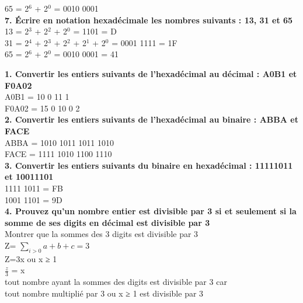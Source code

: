 65 = 2$^{6}$ + 2$^{0}$ = 0010 0001 \\

\textbf{7. Écrire en notation hexadécimale les nombres suivants : 13, 31 et 65} \\

13 = 2$^{3}$ + 2$^{2}$ + 2$^{0}$ = 1101 = D \\

31 = 2$^{4}$ + 2$^{3}$ + 2$^{2}$ + 2$^{1}$ + 2$^{0}$ = 0001 1111 = 1F \\

65 = 2$^{6}$ + 2$^{0}$ = 0010 0001 = 41 \\

\newpage

\textbf{1. Convertir les entiers suivants de l’hexadécimal au décimal : A0B1 et F0A02} \\

A0B1 = 10 0 11 1 \\

F0A02 = 15 0 10 0 2 \\

\textbf{2. Convertir les entiers suivants de l’hexadécimal au binaire : ABBA et FACE} \\

ABBA = 1010 1011 1011 1010 \\

FACE = 1111 1010 1100 1110 \\

\textbf{3. Convertir les entiers suivants du binaire en hexadécimal : 11111011 et 10011101} \\

1111 1011 = FB \\

1001 1101 = 9D \\

\textbf{4. Prouvez qu’un nombre entier est divisible par 3 si et seulement si la somme de ses digits en décimal est divisible par 3} \\

Montrer que la sommes des 3 digits est divisible par 3 \\

Z= $\sum_{i>0} a+b+c=3 $ \\
Z=3x ou x ≥ 1 \\
$\frac{z}{3}$ = x \\

tout nombre ayant la sommes des digits est divisible par 3 car \\
tout nombre multiplié par 3 ou x ≥ 1 est divisible par 3 \\


